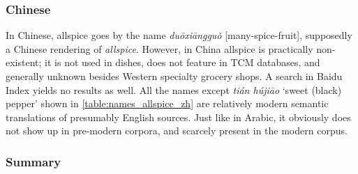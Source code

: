 \subsubsection{Chinese}



In Chinese, allspice goes by the name   \textit{duōxiāngguǒ} [many-spice-fruit], supposedly a Chinese rendering of \textit{allspice}. However, in China allspice is practically non-existent; it is not used in dishes, does not feature in \gls{TCM} databases, and generally unknown besides Western specialty grocery shops. A search in Baidu Index yields no results as well. All the names except  \textit{tián hújiāo} `sweet (black) pepper' shown in \cref{table:names_allspice_zh} are relatively modern semantic translations of presumably English sources. Just like in Arabic, it obviously does not show up in pre-modern corpora, and scarcely present in the modern corpus.

\subsubsection{Summary}









